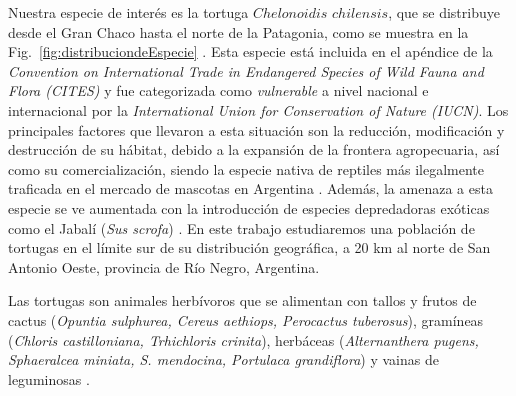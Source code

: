 Nuestra especie de interés es la tortuga $Chelonoidis$ $chilensis$, que se distribuye desde el Gran Chaco hasta el norte de la Patagonia, como se muestra en la Fig.~\ref{fig:distribuciondeEspecie} \cite{chebez2008se}. Esta especie está incluida en el apéndice de la \textit{Convention on International Trade in Endangered Species of Wild Fauna and Flora (CITES)} y fue categorizada como \textit{vulnerable} a nivel nacional \cite{prado2012categorizacion} e internacional por la \textit{International Union for Conservation of Nature (IUCN)}.
Los principales factores que llevaron a esta situación son la reducción, modificación y destrucción de su hábitat, debido a la expansión de la frontera agropecuaria, así como su comercialización, siendo la especie nativa de reptiles más ilegalmente traficada en el mercado de mascotas en Argentina \cite{prado2012categorizacion}. Además, la amenaza a esta especie se ve aumentada con la introducción de especies depredadoras exóticas como el Jabalí (\textit{Sus scrofa}) \cite{kubisch2014chelonoidis}. En este trabajo estudiaremos una población de tortugas  en el límite sur de su distribución geográfica, a 20 km al norte de San Antonio Oeste, provincia de Río Negro, Argentina.  
   
Las tortugas son animales  herbívoros que se alimentan con tallos y frutos de cactus (\textit{Opuntia sulphurea, Cereus aethiops, Perocactus tuberosus}), gramíneas (\textit{Chloris castilloniana, Trhichloris crinita}), herbáceas (\textit{Alternanthera pugens, Sphaeralcea miniata, S. mendocina, Portulaca grandiflora}) y vainas de leguminosas \cite{zacarias2016biologia}.
   

